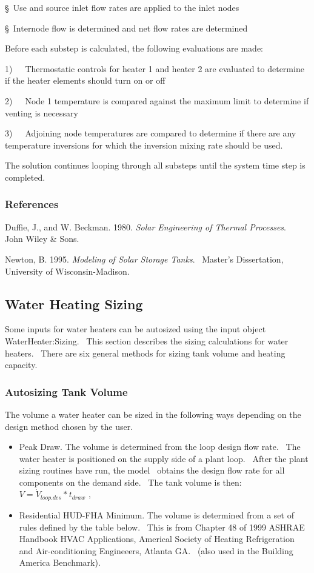 §~Use and source inlet flow rates are applied to the inlet nodes

§~Internode flow is determined and net flow rates are determined

Before each substep is calculated, the following evaluations are made:

1)~~~Thermostatic controls for heater 1 and heater 2 are evaluated to determine if the heater elements should turn on or off

2)~~~Node 1 temperature is compared against the maximum limit to determine if venting is necessary

3)~~~Adjoining node temperatures are compared to determine if there are any temperature inversions for which the inversion mixing rate should be used.

The solution continues looping through all substeps until the system time step is completed.

\subsubsection{References}\label{references-1-017}

Duffie, J., and W. Beckman. 1980. \emph{Solar Engineering of Thermal Processes}.~ John Wiley \& Sons.

Newton, B. 1995. \emph{Modeling of Solar Storage Tanks}.~ Master's Dissertation, University of Wisconsin-Madison.

\subsection{Water Heating Sizing}\label{water-heating-sizing}

Some inputs for water heaters can be autosized using the input object WaterHeater:Sizing.~ This section describes the sizing calculations for water heaters.~ There are six general methods for sizing tank volume and heating capacity.

\subsubsection{Autosizing Tank Volume}\label{autosizing-tank-volume}

The volume a water heater can be sized in the following ways depending on the design method chosen by the user.

\begin{itemize}
  \item Peak Draw. The volume is determined from the loop design flow rate.~ The water heater is positioned on the supply side of a plant loop.~ After the plant sizing routines have run, the model~ obtains the design flow rate for all components on the demand side.~ The tank volume is then: \(V = {\dot V_{loop.des}}*{t_{draw}}\) ,

  \item Residential HUD-FHA Minimum. The volume is determined from a set of rules defined by the table below.~ This is from Chapter 48 of 1999 ASHRAE Handbook HVAC Applications, Americal Society of Heating Refrigeration and Air-conditioning Engineeers, Atlanta GA.~ (also used in the Building America Benchmark).
\end{itemize}

